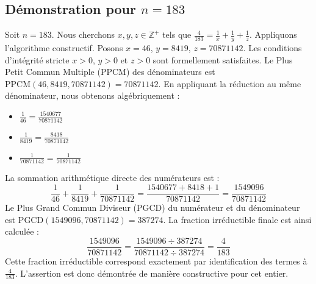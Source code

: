 \documentclass[11pt,a4paper]{article}
\begin{document}
\subsection{Démonstration pour $n = 183$}
Soit $n = 183$. Nous cherchons $x, y, z \in \mathbb{Z}^{+}$ tels que $\frac{4}{183} = \frac{1}{x} + \frac{1}{y} + \frac{1}{z}$.
Appliquons l'algorithme constructif. Posons $x = 46$, $y = 8419$, $z = 70871142$.
Les conditions d'intégrité stricte $x > 0$, $y > 0$ et $z > 0$ sont formellement satisfaites.
Le Plus Petit Commun Multiple (PPCM) des dénominateurs est $\text{PPCM}(46, 8419, 70871142) = 70871142$.
En appliquant la réduction au même dénominateur, nous obtenons algébriquement :
\begin{itemize}
    \item $\frac{1}{46} = \frac{1540677}{70871142}$
    \item $\frac{1}{8419} = \frac{8418}{70871142}$
    \item $\frac{1}{70871142} = \frac{1}{70871142}$
\end{itemize}
La sommation arithmétique directe des numérateurs est :
$$ \frac{1}{46} + \frac{1}{8419} + \frac{1}{70871142} = \frac{1540677 + 8418 + 1}{70871142} = \frac{1549096}{70871142} $$
Le Plus Grand Commun Diviseur (PGCD) du numérateur et du dénominateur est $\text{PGCD}(1549096, 70871142) = 387274$.
La fraction irréductible finale est ainsi calculée :
$$ \frac{1549096}{70871142} = \frac{1549096 \div 387274}{70871142 \div 387274} = \frac{4}{183} $$
Cette fraction irréductible correspond exactement par identification des termes à $\frac{4}{183}$. L'assertion est donc démontrée de manière constructive pour cet entier.
\end{document}
